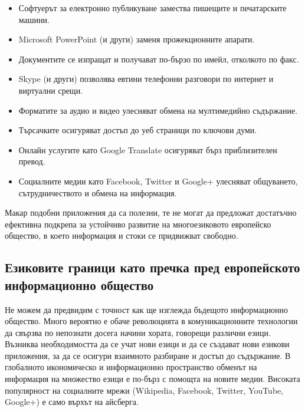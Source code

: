 \documentclass[]{../../metanetpaper}
\begin{document}
\begin{multicols}{2}
\begin{itemize}
\item Софтуерът за електронно публикуване замества пишещите и печатарските машини.
\item Microsoft PowerPoint (и други) заменя прожекционните апарати.
\item Документите се изпращат и получават по-бързо по имейл, отколкото по факс.
\item Skype (и други) позволява евтини телефонни разговори по интернет и виртуални срещи.
\item Форматите за аудио и видео улесняват обмена на мултимедийно съдържание.
\item Търсачките осигуряват достъп до уеб страници по ключови думи.
\item Онлайн услугите като  Google Translate  осигуряват бърз приблизителен превод.
\item Социалните медии като   Facebook,  Twitter  и  Google+   улесняват общуването, сътрудничеството и обмена на информация.
\end{itemize}

Макар подобни приложения да са полезни, те не могат да предложат достатъчно ефективна подкрепа за устойчиво развитие на многоезиковото европейско общество, в което информация и стоки се придвижват свободно.

\subsection{Езиковите граници като пречка пред европейското информационно общество}
  
Не можем да предвидим с точност как ще изглежда
бъдещото информационно общество. Много вероятно е обаче революцията в комуникационните технологии да свързва по непознати досега начини хората, говорещи различни езици.
Възниква необходимостта да се учат нови езици и да се създават нови езикови приложения, за да се осигури взаимното разбиране и достъп до съдържание. В глобалното икономическо и информационно пространство обменът на информация на множество езици е по-бърз с помощта на новите медии. Високата популярност на социалните мрежи  (Wikipedia, Facebook, Twitter, YouTube, Google+)  е само върхът на айсберга.


\end{multicols}
\end{document}
